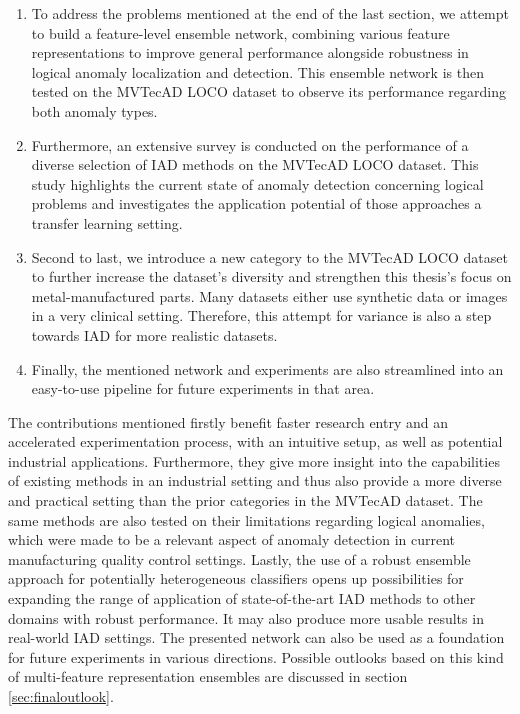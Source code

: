 \begin{enumerate}
\item To address the problems mentioned at the end of the last section, we attempt 
to build a feature-level ensemble network, combining various feature representations to improve 
general performance alongside robustness in logical anomaly localization and detection. This ensemble network is then tested on 
the MVTecAD LOCO dataset \cite{LOCODentsAndScratchesBergmann2022} to observe its performance regarding both anomaly types.
\item Furthermore, an extensive survey is conducted on the performance of a diverse selection of IAD methods on the MVTecAD LOCO dataset. 
This study highlights the current state of anomaly detection concerning logical problems and investigates the application potential of 
those approaches a transfer learning setting.
\item Second to last, we introduce a new category to the MVTecAD LOCO dataset to further increase the dataset's diversity and strengthen this thesis's focus on metal-manufactured parts. Many datasets either use synthetic data or images in a very clinical setting. Therefore, this 
attempt for variance is also a step towards IAD for more realistic datasets.
\item Finally, the mentioned network and experiments are also streamlined into an easy-to-use pipeline 
for future experiments in that area.
\end{enumerate}


The contributions mentioned firstly benefit faster research entry and an accelerated experimentation process, with an intuitive setup, 
as well as potential industrial applications. 
Furthermore, they give more insight into the capabilities of existing methods in an industrial setting and thus also provide a more 
diverse and practical setting than the prior categories in the MVTecAD \cite{LOCODentsAndScratchesBergmann2022} dataset. The same methods are also tested on their limitations 
regarding logical anomalies, which were made to be a relevant aspect of anomaly detection in current manufacturing quality control 
settings. Lastly, the use of a robust ensemble approach for potentially heterogeneous classifiers opens up possibilities for expanding 
the range of application of state-of-the-art IAD methods to other domains with robust performance. It may also produce more usable results in real-world IAD settings. The presented network can also be used as a foundation for future experiments in 
various directions. Possible outlooks based on this kind of multi-feature representation ensembles are discussed in section \ref{sec:finaloutlook}.
\newline
\newline


